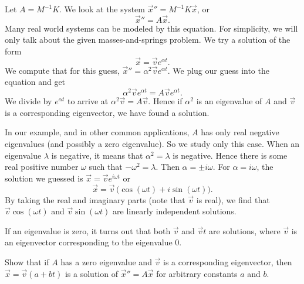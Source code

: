 \medskip

Let $A = M^{-1}K$.  We look at the system
${\vec{x}}'' = M^{-1}K \vec{x}$, or
\begin{equation*}
{\vec{x}}'' = A \vec{x} .
\end{equation*}
Many real world systems can be modeled by this equation.  For simplicity,
we will only talk about the
given masses-and-springs problem.  We try a solution of the form
\begin{equation*}
\vec{x} = \vec{v} e^{\alpha t} .
\end{equation*}
We compute that for this guess,
${\vec{x}}'' = \alpha^2 \vec{v} e^{\alpha t}$.
We plug our guess into the equation and get
\begin{equation*}
\alpha^2 \vec{v} e^{\alpha t} = A\vec{v} e^{\alpha t} .
\end{equation*}
We divide by $e^{\alpha t}$ to arrive at
$\alpha^2 \vec{v} = A\vec{v}$.  Hence if $\alpha^2$ is an eigenvalue
of $A$ and $\vec{v}$ is a corresponding eigenvector, we have found
a solution.

In our example, and in other common applications,
$A$ has only real negative
eigenvalues (and possibly a zero eigenvalue).  So we study only this
case.  When an eigenvalue $\lambda$ is negative, it means that
$\alpha^2 = \lambda$ is negative.  Hence there is some real positive number $\omega$
such that $-\omega^2 = \lambda$.  Then $\alpha = \pm i \omega$.
For $\alpha = i \omega$, the solution we guessed is $\vec{x} = \vec{v} e^{i \omega t}$ or
\begin{equation*}
\vec{x} = \vec{v} \, \bigl(\cos (\omega t) + i \sin (\omega t) \bigr) .
\end{equation*}
By taking the real and imaginary parts (note that $\vec{v}$ is real), we
find that 
$\vec{v} \cos (\omega t)$ and
$\vec{v} \sin (\omega t)$ are linearly independent solutions.

If an eigenvalue is zero, it turns out that both $\vec{v}$ and $\vec{v} t$ are
solutions, where $\vec{v}$ is an eigenvector corresponding to the eigenvalue
0.

\begin{exercise}
Show that if $A$ has a zero eigenvalue and $\vec{v}$ is a
corresponding eigenvector, then $\vec{x} = \vec{v} (a + bt)$ is a solution
of ${\vec{x}}'' = A \vec{x}$ for
arbitrary constants $a$ and $b$.
\end{exercise}

